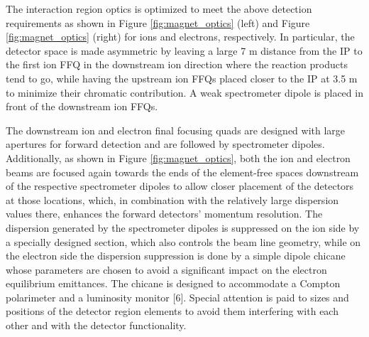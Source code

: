 The interaction region optics is optimized to meet the above detection requirements as shown in Figure \ref{fig:magnet_optics} (left) and Figure \ref{fig:magnet_optics} (right) for ions and electrons, respectively. In particular, the detector space is made asymmetric by leaving a large 7 m distance from the IP to the first ion FFQ in the downstream ion direction where the reaction products tend to go, while having the upstream ion FFQs placed closer to the IP at 3.5 m to minimize their chromatic contribution. A weak spectrometer dipole is placed in front of the downstream ion FFQs.

The downstream ion and electron final focusing quads are designed with large apertures for forward detection and are followed by spectrometer dipoles. Additionally, as shown in Figure \ref{fig:magnet_optics}, both the ion and electron beams are focused again towards the ends of the element-free spaces downstream of the respective spectrometer dipoles to allow closer placement of the detectors at those locations, which, in combination with the relatively large dispersion values there, enhances the forward detectors’ momentum resolution. The dispersion generated by the spectrometer dipoles is suppressed on the ion side by a specially designed section, which also controls the beam line geometry, while on the electron side the dispersion suppression is done by a simple dipole chicane whose parameters are chosen to avoid a significant impact on the electron equilibrium emittances. The chicane is designed to accommodate a Compton polarimeter and a luminosity monitor [6]. Special attention is paid to sizes and positions of the detector region elements to avoid them interfering with each other and with the detector functionality. 

